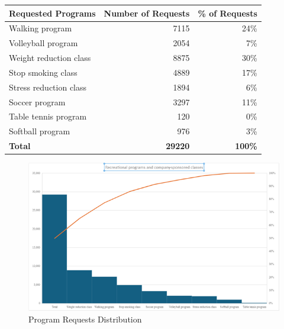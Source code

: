 \begin{tabular}{|l|r|r|}
\hline
\textbf{Requested Programs} & \textbf{Number of Requests} & \textbf{\% of Requests} \\
\hline
Walking program & 7115 & 24\% \\
Volleyball program & 2054 & 7\% \\
Weight reduction class & 8875 & 30\% \\
Stop smoking class & 4889 & 17\% \\
Stress reduction class & 1894 & 6\% \\
Soccer program & 3297 & 11\% \\
Table tennis program & 120 & 0\% \\
Softball program & 976 & 3\% \\
\hline
\textbf{Total} & \textbf{29220} & \textbf{100\%} \\
\hline
\end{tabular}

\begin{figure}[h!]
    \centering
    \includegraphics[width=\textwidth]{image.png}
    \caption{Program Requests Distribution}
\end{figure}

